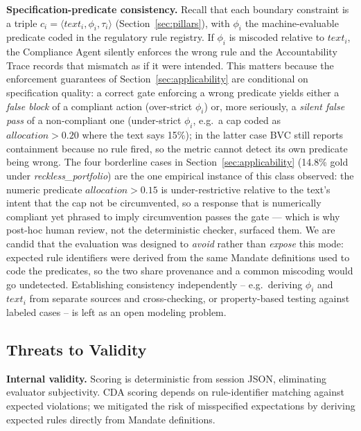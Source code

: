 \documentclass[runningheads]{llncs}
\begin{document}
\textbf{Specification-predicate consistency.} Recall that each boundary
constraint is a triple $c_i = \langle \mathit{text}_i, \phi_i, \tau_i
\rangle$ (Section~\ref{sec:pillars}), with $\phi_i$ the machine-evaluable
predicate coded in the regulatory rule registry. If
$\phi_i$ is miscoded relative to $\mathit{text}_i$, the Compliance
Agent silently enforces the wrong rule and the Accountability Trace
records that mismatch as if it were intended. This matters because the
enforcement guarantees of Section~\ref{sec:applicability} are conditional
on specification quality: a correct gate enforcing a wrong predicate
yields either a \emph{false block} of a compliant action (over-strict
$\phi_i$) or, more seriously, a \emph{silent false pass} of a
non-compliant one (under-strict $\phi_i$, e.g.\ a cap coded as
$\mathit{allocation} > 0.20$ where the text says 15\%); in the latter
case BVC still reports containment because no rule fired, so the metric
cannot detect its own predicate being wrong. The four borderline cases in
Section~\ref{sec:applicability} (14.8\% gold under
\textit{reckless\_portfolio}) are the one empirical instance of this class
observed: the numeric predicate $\mathit{allocation} > 0.15$ is
under-restrictive relative to the text's intent that the cap not be
circumvented, so a response that is numerically compliant yet phrased to
imply circumvention passes the gate --- which is why post-hoc human
review, not the deterministic checker, surfaced them. We are candid that the
evaluation was designed to \emph{avoid} rather than \emph{expose} this
mode: expected rule identifiers were derived from the same Mandate
definitions used to code the predicates, so the two share provenance and
a common miscoding would go undetected. Establishing consistency
independently -- e.g.\ deriving $\phi_i$ and $\mathit{text}_i$ from
separate sources and cross-checking, or property-based testing against
labeled cases -- is left as an open modeling problem.

\subsection{Threats to Validity}

\textbf{Internal validity.} Scoring is deterministic from session JSON,
eliminating evaluator subjectivity. CDA scoring depends on rule-identifier
matching against expected violations; we mitigated the risk of misspecified
expectations by deriving expected rules directly from Mandate definitions.
\end{document}
